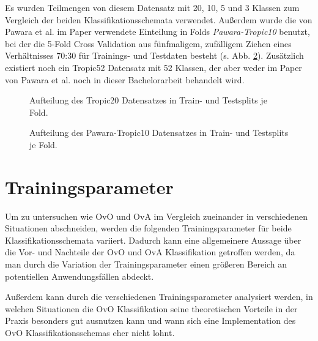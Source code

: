 Es wurden Teilmengen von diesem Datensatz mit 20, 10, 5 und 3 Klassen zum Vergleich der beiden Klassifikationsschemata verwendet. Außerdem wurde die von Pawara et al. im Paper \cite{pawaraPaper} verwendete Einteilung in Folds \textit{Pawara-Tropic10} \cite{pawaraWebsiteDatensaetze} benutzt, bei der die 5-Fold Cross Validation aus fünfmaligem, zufälligem Ziehen eines Verhältnisses 70:30 für Trainings- und Testdaten besteht (s. Abb. \ref{fig:pawaraTropic10Zusammensetzung}).
Zusätzlich existiert noch ein Tropic52 Datensatz \cite{pawaraWebsiteDatensaetze} mit 52 Klassen, der aber weder im Paper von Pawara et al. \cite{pawaraPaper} noch in dieser Bachelorarbeit behandelt wird.

\begin{figure}[H]
\begin{adjustbox}{width=1.4\textwidth, center}

\end{adjustbox}
\caption{Aufteilung des Tropic20 Datensatzes \cite{pawaraWebsiteDatensaetze} in Train- und Testsplits je Fold.}
\label{fig:tropic20Zusammensetzung}
\end{figure}
\begin{figure}[H]
\begin{adjustbox}{width=1.4\textwidth, center}

\end{adjustbox}
\caption{Aufteilung des Pawara-Tropic10 Datensatzes \cite{pawaraWebsiteDatensaetze} in Train- und Testsplits je Fold.}
\label{fig:pawaraTropic10Zusammensetzung}
\end{figure}


\section{Trainingsparameter}
\label{ch:methodik_parameter}
Um zu untersuchen wie OvO und OvA im Vergleich zueinander in verschiedenen Situationen abschneiden, werden die folgenden Trainingsparameter für beide Klassifikationsschemata variiert.
Dadurch kann eine allgemeinere Aussage über die Vor- und Nachteile der OvO und OvA Klassifikation getroffen werden, da man durch die Variation der Trainingsparameter einen größeren Bereich an potentiellen Anwendungsfällen abdeckt.

Außerdem kann durch die verschiedenen Trainingsparameter analysiert werden, in welchen Situationen die OvO Klassifikation seine theoretischen Vorteile in der Praxis besonders gut ausnutzen kann und wann sich eine Implementation des OvO Klassifikationsschemas eher nicht lohnt.

